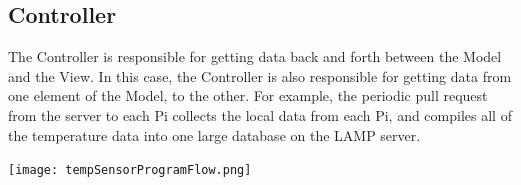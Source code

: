 \documentclass{article}
\begin{document}
	\newpage		
			
		\subsection{Controller}
			The Controller is responsible for getting data back and forth between the Model and the View. In this case, the Controller
			is also responsible for getting data from one element of the Model, to the other. For example, the periodic pull request 
			from the server to each Pi collects the local data from each Pi, and compiles all of the temperature data into one large
			database on the LAMP server.
			
			\begin{center}
				\texttt{[image: tempSensorProgramFlow.png]}\\
			\end{center}
					
\end{document}
